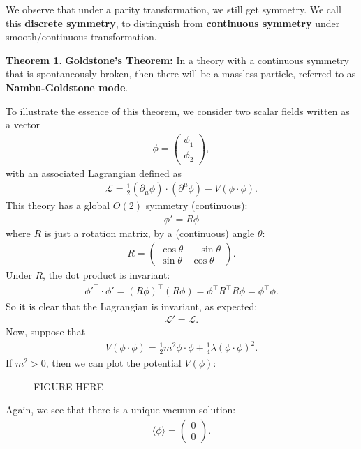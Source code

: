 \documentclass[a4paper,11pt]{article}
\numberwithin{equation}{section}
\theoremstyle{definition}
\newtheorem{thm}{Theorem}[section]
\newcommand{\p}{\partial}
\newcommand{\lag}{\mathcal{L}}
\begin{document}
We observe that under a parity transformation, we still get symmetry. We call this \textbf{discrete symmetry}, to distinguish from \textbf{continuous symmetry} under smooth/continuous transformation.\\

\begin{thm}
	\textbf{Goldstone's Theorem:} In a theory with a continuous symmetry that is spontaneously broken, then there will be a massless particle, referred to as \textbf{Nambu-Goldstone mode}. 
\end{thm}
To illustrate the essence of this theorem, we consider two scalar fields written as a vector
\begin{align}
\phi = \begin{pmatrix}
\phi_1 \\ \phi_2
\end{pmatrix},
\end{align}
with an associated Lagrangian defined as
\begin{align}
\lag = \frac{1}{2}(\p_\mu\phi)\cdot(\p^\mu\phi) - V(\phi \cdot \phi).
\end{align}
This theory has a global $O(2)$ symmetry (continuous):
\begin{align}
\phi' = R\phi
\end{align}
where $R$ is just a rotation matrix, by a (continuous) angle $\theta$:
\begin{align}
R = \begin{pmatrix}
\cos\theta & -\sin\theta\\
\sin\theta & \cos\theta
\end{pmatrix}.
\end{align}
Under $R$, the dot product is invariant:
\begin{align}
\phi'^\top\cdot\phi' = (R\phi)^\top(R\phi) = \phi^\top R^\top R\phi = \phi^\top \phi.
\end{align}
So it is clear that the Lagrangian is invariant, as expected:
\begin{align}
\lag' = \lag.
\end{align}
Now, suppose that
\begin{align}
V(\phi\cdot\phi) = \frac{1}{2}m^2\phi\cdot\phi + \frac{1}{4}\lambda(\phi\cdot\phi)^2.
\end{align}
If $m^2 > 0$, then we can plot the potential $V(\phi)$:
\begin{figure}[h!]
	FIGURE HERE
\end{figure}
Again, we see that there is a unique vacuum solution:
\begin{align}
\langle \phi \rangle = \begin{pmatrix}
0\\0
\end{pmatrix}.
\end{align}
\end{document}

